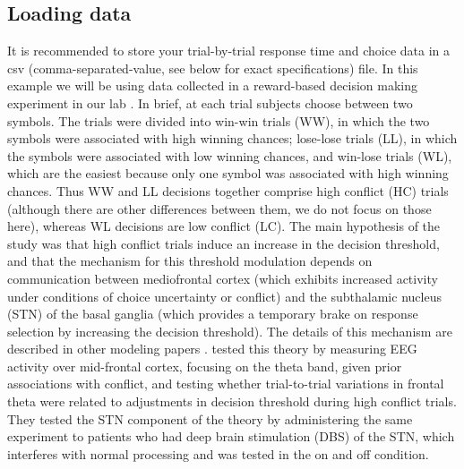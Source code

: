 \documentclass[letterpaper,10pt,english]{article}
\begin{document}
\subsection*{Loading data}
\label{demo:loading-data}
It is recommended to store your trial-by-trial response time and
choice data in a csv (comma-separated-value, see below for exact
specifications) file. In this example we will be using data collected
in a reward-based decision making experiment in our lab
\citep{CavanaghWieckiCohenEtAl11}. In brief, at each trial subjects
choose between two symbols. The trials were divided into win-win
trials (WW), in which the two symbols were associated with high
winning chances; lose-lose trials (LL), in which the symbols were
associated with low winning chances, and win-lose trials (WL), which
are the easiest because only one symbol was associated with high
winning chances. Thus WW and LL decisions together comprise high
conflict (HC) trials (although there are other differences between
them, we do not focus on those here), whereas WL decisions are low
conflict (LC).  The main hypothesis of the study was that high
conflict trials induce an increase in the decision threshold, and that
the mechanism for this threshold modulation depends on communication
between mediofrontal cortex (which exhibits increased activity under
conditions of choice uncertainty or conflict) and the subthalamic
nucleus (STN) of the basal ganglia (which provides a temporary brake
on response selection by increasing the decision threshold). The
details of this mechanism are described in other modeling papers
\citep[e.g.][]{RatcliffFrank12}. \citet{CavanaghWieckiCohenEtAl11}
tested this theory by measuring EEG activity over mid-frontal cortex,
focusing on the theta band, given prior associations with conflict,
and testing whether trial-to-trial variations in frontal theta were
related to adjustments in decision threshold during high conflict
trials. They tested the STN component of the theory by administering
the same experiment to patients who had deep brain stimulation (DBS)
of the STN, which interferes with normal processing and was tested in the on and off condition.
\end{document}
